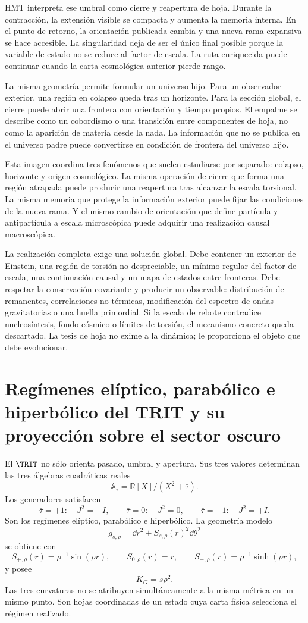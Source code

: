 HMT interpreta ese umbral como cierre y reapertura de hoja. Durante la contracción,
la extensión visible se compacta y aumenta la memoria interna. En el punto de
retorno, la orientación publicada cambia y una nueva rama expansiva se hace
accesible. La singularidad deja de ser el único final posible porque la variable de
estado no se reduce al factor de escala. La ruta enriquecida puede continuar cuando
la carta cosmológica anterior pierde rango.

La misma geometría permite formular un universo hijo. Para un observador exterior,
una región en colapso queda tras un horizonte. Para la sección global, el cierre
puede abrir una frontera con orientación y tiempo propios. El empalme se describe
como un cobordismo o una transición entre componentes de hoja, no como la aparición
de materia desde la nada. La información que no se publica en el universo padre
puede convertirse en condición de frontera del universo hijo.

Esta imagen coordina tres fenómenos que suelen estudiarse por separado: colapso,
horizonte y origen cosmológico. La misma operación de cierre que forma una región
atrapada puede producir una reapertura tras alcanzar la escala torsional. La misma
memoria que protege la información exterior puede fijar las condiciones de la nueva
rama. Y el mismo cambio de orientación que define partícula y antipartícula a escala
microscópica puede adquirir una realización causal macroscópica.

La realización completa exige una solución global. Debe contener un exterior de
Einstein, una región de torsión no despreciable, un mínimo regular del factor de
escala, una continuación causal y un mapa de estados entre fronteras. Debe respetar
la conservación covariante y producir un observable: distribución de remanentes,
correlaciones no térmicas, modificación del espectro de ondas gravitatorias o una
huella primordial. Si la escala de rebote contradice nucleosíntesis, fondo cósmico o
límites de torsión, el mecanismo concreto queda descartado. La tesis de hoja no
exime a la dinámica; le proporciona el objeto que debe evolucionar.

\section{Regímenes elíptico, parabólico e hiperbólico del TRIT y su proyección sobre el sector oscuro}

El \(\TRIT\) no sólo orienta pasado, umbral y apertura. Sus tres valores determinan
las tres álgebras cuadráticas reales
\[
 \mathbb A_\tau
 =
 \mathbb R[X]/(X^2+\bar\tau).
\]
Los generadores satisfacen
\[
 \bar\tau=+1:
 \quad J^2=-I,
 \qquad
 \bar\tau=0:
 \quad J^2=0,
 \qquad
 \bar\tau=-1:
 \quad J^2=+I.
\]
Son los regímenes elíptico, parabólico e hiperbólico. La geometría modelo
\[
 g_{s,\rho}
 =
 \dd r^2+S_{s,\rho}(r)^2\dd\theta^2
\]
se obtiene con
\[
 S_{+,\rho}(r)=\rho^{-1}\sin(\rho r),
 \qquad
 S_{0,\rho}(r)=r,
 \qquad
 S_{-,\rho}(r)=\rho^{-1}\sinh(\rho r),
\]
y posee
\[
 K_G=s\rho^2.
\]
Las tres curvaturas no se atribuyen simultáneamente a la misma métrica en un mismo
punto. Son hojas coordinadas de un estado cuya carta física selecciona el régimen
realizado.

